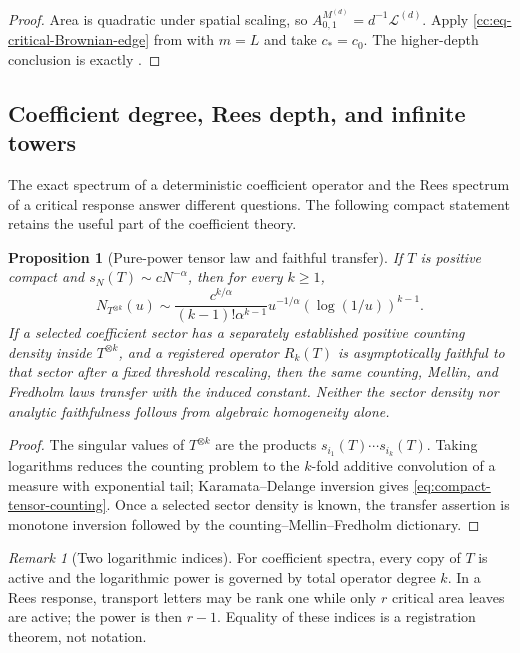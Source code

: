 \documentclass[10pt,reqno]{amsart}
\theoremstyle{plain}
\newtheorem{proposition}[theorem]{Proposition}
\theoremstyle{definition}
\theoremstyle{remark}
\newtheorem{remark}[theorem]{Remark}
\begin{document}
\begin{proof}
Area is quadratic under spatial scaling, so
$A^{M^{(d)}}_{0,1}=d^{-1}\mathcal L^{(d)}$.  Apply
\eqref{cc:eq-critical-Brownian-edge} from
 with $m=L$ and take $c_*=c_0$.
The higher-depth conclusion is exactly
.
\end{proof}

\subsection{Coefficient degree, Rees depth, and infinite towers}

The exact spectrum of a deterministic coefficient operator and the Rees
spectrum of a critical response answer different questions.  The following
compact statement retains the useful part of the coefficient theory.

\begin{proposition}[Pure-power tensor law and faithful transfer]
\label{prop:compact-coefficient-law}
If $T$ is positive compact and
$s_N(T)\sim cN^{-\alpha}$, then for every $k\ge1$,
\begin{equation}
 N_{T^{\otimes k}}(u)
 \sim\frac{c^{k/\alpha}}{(k-1)!\alpha^{k-1}}
 u^{-1/\alpha}(\log(1/u))^{k-1}.
 \label{eq:compact-tensor-counting}
\end{equation}
If a selected coefficient sector has a separately established positive
counting density inside $T^{\otimes k}$, and a registered operator $R_k(T)$ is
asymptotically faithful to that sector after a fixed threshold rescaling, then
the same counting, Mellin, and Fredholm laws transfer with the induced
constant.  Neither the sector density nor analytic faithfulness follows from
algebraic homogeneity alone.
\end{proposition}

\begin{proof}
The singular values of $T^{\otimes k}$ are the products
$s_{i_1}(T)\cdots s_{i_k}(T)$.  Taking logarithms reduces the counting problem
to the $k$-fold additive convolution of a measure with exponential tail;
Karamata--Delange inversion gives \eqref{eq:compact-tensor-counting}.  Once
a selected sector density is known, the transfer assertion is monotone
inversion followed by the counting--Mellin--Fredholm dictionary.
\end{proof}

\begin{remark}[Two logarithmic indices]
For coefficient spectra, every copy of $T$ is active and the logarithmic power
is governed by total operator degree $k$.  In a Rees response, transport
letters may be rank one while only $r$ critical area leaves are active; the
power is then $r-1$.  Equality of these indices is a registration theorem,
not notation.
\end{remark}
\end{document}
